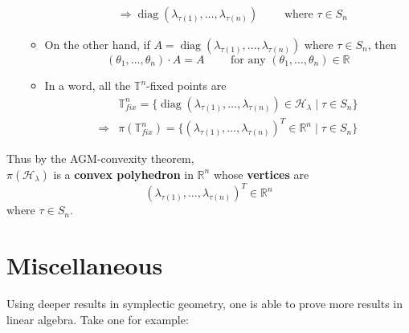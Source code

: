 \documentclass[11pt]{amsart}
\numberwithin{equation}{section}
\theoremstyle{plain}
\theoremstyle{plain}
\numberwithin{equation}{section}
\theoremstyle{remark}
\DeclareMathOperator{\diag}{diag}
\begin{document}
\begin{itemize}
\begin{itemize}
\begin{equation*}
\begin{aligned}
			&\Rightarrow \diag(\lambda_{\tau(1)},\ldots,\lambda_{\tau(n)})  \qquad\text{ where } \tau \in S_n
		\end{aligned}
		\end{equation*}
		\item On the other hand, if $A=\diag (\lambda_{\tau(1)},\ldots,\lambda_{\tau(n)})$ where $\tau \in S_n$, then
		$$(\theta_1,\ldots, \theta_n)\cdot A=A \qquad\text{ for any } (\theta_1,\ldots, \theta_n) \in \mathbb{R}$$
		\item In a word, all the $\mathbb{T}^n$-fixed points are
		\begin{equation*}
		\begin{aligned}
		&\mathbb{T}^n_{fix}=\{\diag(\lambda_{\tau(1)},\ldots,\lambda_{\tau(n)}) \in \mathcal{H}_\lambda \mid \tau \in S_n\}\\
		\Rightarrow& \pi(\mathbb{T}^n_{fix})=\{(\lambda_{\tau(1)},\ldots,\lambda_{\tau(n)})^T \in \mathbb{R}^n \mid \tau \in S_n\}
		\end{aligned}
		\end{equation*}
	\end{itemize}
\end{itemize}

Thus by the AGM-convexity theorem,\\
$\pi (\mathcal{H}_\lambda)$ is a \textbf{convex polyhedron} in $\mathbb{R}^n$ whose \textbf{vertices} are
$$(\lambda_{\tau(1)},\ldots,\lambda_{\tau(n)})^T \in \mathbb{R}^n$$
where $\tau \in S_n$.


\section{Miscellaneous} 
Using deeper results in symplectic geometry, one is able to prove more results in linear algebra. Take one for example:
\end{document}
